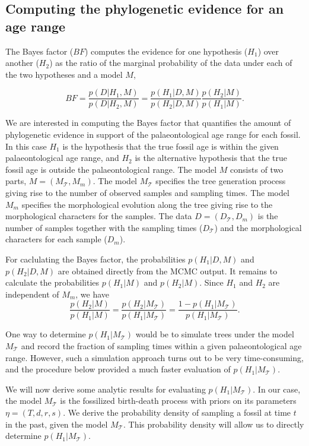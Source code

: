 \documentclass[11pt]{article}
\begin{document}
\subsection*{Computing the phylogenetic evidence for an age range}

The Bayes factor ($BF$) computes the evidence for one hypothesis ($H_1$) over another ($H_2$) as the ratio of the marginal probability of the data under each of the two hypotheses and a model $M$, 

\begin{equation}
BF = \frac{p(D|H_1,M)}{p(D|H_2,M)} = \frac{p(H_1|D,M)}{p(H_2|D,M)}\frac{p(H_2|M)}{p(H_1|M)}.
\end{equation}

We are interested in computing the Bayes factor that quantifies the amount of phylogenetic evidence in support of the palaeontological age range for each fossil. In this case $H_1$ is the hypothesis that the true fossil age is within the given palaeontological age range, and $H_2$ is the alternative hypothesis that the true fossil age is outside the palaeontological range. 
The model $M$ consists of two parts, $M=(M_\mathcal{T},M_m)$. The model $M_\mathcal{T}$ specifies the tree generation process  giving rise to the number of observed samples and sampling times. The model $M_m$ specifies the morphological evolution along the tree giving rise to the morphological characters for the samples. The data $D=(D_\mathcal{T},D_m)$ is the number of samples together with the sampling times ($D_\mathcal{T}$) and  the morphological characters for each sample ($D_m$). 


For caclulating the Bayes factor, the probabilities $p(H_1|D,M)$ and $p(H_2|D,M)$ are obtained directly from the MCMC output.
It remains to calculate the probabilities $p(H_1|M)$ and $p(H_2|M)$.
Since $H_1$ and $H_2$ are independent of $M_m$, we have $$\frac{p(H_2|M)}{p(H_1|M)}=\frac{p(H_2|M_\mathcal{T})}{p(H_1|M_\mathcal{T})}=\frac{1-p(H_1|M_\mathcal{T})}{p(H_1|M_\mathcal{T})}.$$

One way to determine $p(H_1|M_\mathcal{T})$ would be to simulate trees under the model $M_\mathcal{T}$ and record the fraction of sampling times  within a given palaeontological age range. However, such a simulation approach turns out to be very time-consuming, and the procedure below provided a much faster evaluation of $p(H_1|M_\mathcal{T})$.

We  will now derive some analytic results for evaluating $p(H_1|M_\mathcal{T})$. In our case, the model $M_\mathcal{T}$ is the fossilized birth-death process with priors on its parameters $\eta=(T,d,r,s)$. 
We derive the probability density of sampling a fossil at time $t$ in the past, given the model $M_\mathcal{T}$. This probability density will allow us to directly determine $p(H_1|M_\mathcal{T})$.
\end{document}
